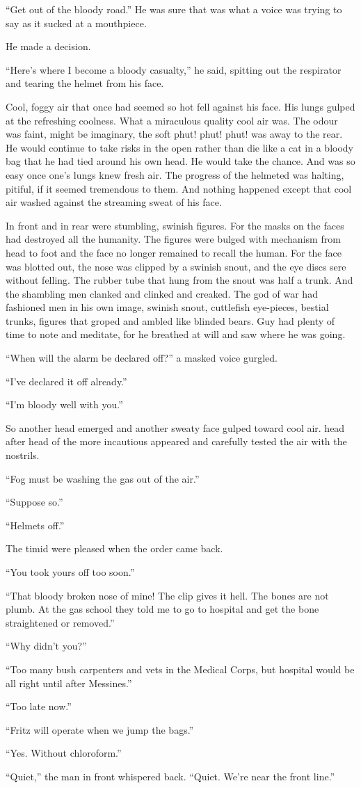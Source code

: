 ``Get out of the bloody road.'' He was sure that was what a voice was trying to say as it sucked at a mouthpiece.

He made a decision.

``Here's where I become a bloody casualty,'' he said, spitting out the respirator and tearing the helmet from his face.

Cool, foggy air that once had seemed so hot fell against his face. His lungs gulped at the refreshing coolness. What a miraculous quality cool air was. The odour was faint, might be imaginary, the soft phut! phut! phut! was away to the rear. He would continue to take risks in the open rather than die like a cat in a bloody bag that he had tied around his own head. He would take the chance. And was so easy once one's lungs knew fresh air. The progress of the helmeted was halting, pitiful, if it seemed tremendous to them. And nothing happened except that cool air washed against the streaming sweat of his face.

In front and in rear were stumbling, swinish figures. For the masks on the faces had destroyed all the humanity. The figures were bulged with mechanism from head to foot and the face no longer remained to recall the human. For the face was blotted out, the nose was clipped by a swinish snout, and the eye discs sere without felling. The rubber tube that hung from the snout was half a trunk. And the shambling men clanked and clinked and creaked. The god of war had fashioned men in his own image, swinish snout, cuttlefish eye-pieces, bestial trunks, figures that groped and ambled like blinded bears. Guy had plenty of time to note and meditate, for he breathed at will and saw where he was going.

``When will the alarm be declared off?'' a masked voice gurgled.

``I've declared it off already.''

``I'm bloody well with you.''

So another head emerged and another sweaty face gulped toward cool air. head after head of the more incautious appeared and carefully tested the air with the nostrils.

``Fog must be washing the gas out of the air.''

``Suppose so.''

``Helmets off.''

The timid were pleased when the order came back.

``You took yours off too soon.''

``That bloody broken nose of mine! The clip gives it hell. The bones are not plumb. At the gas school they told me to go to hospital and get the bone straightened or removed.''

``Why didn't you?''

``Too many bush carpenters and vets in the Medical Corps, but hospital would be all right until after Messines.''

``Too late now.''

``Fritz will operate when we jump the bags.''

``Yes. Without chloroform.''

``Quiet,'' the man in front whispered back. ``Quiet. We're near the front line.''